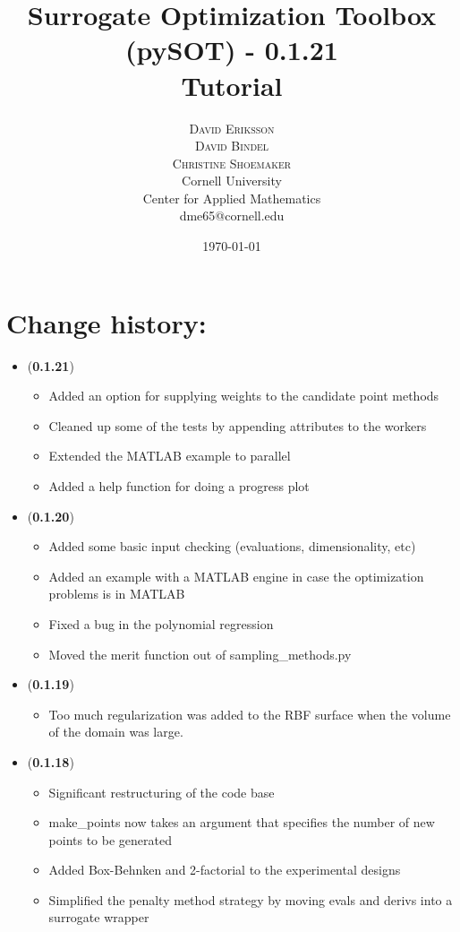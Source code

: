 \documentclass[]{article}
\title{\vspace{-15mm}%
	\fontsize{18pt}{10pt}\selectfont
	\textbf{Surrogate Optimization Toolbox (pySOT) - 0.1.21 \\ Tutorial}
	}
\author{%
	\Large\textsc{David Eriksson} \\[2mm]
	\Large\textsc{David Bindel} \\[2mm]
	\Large\textsc{Christine Shoemaker} \\[2mm]
		\normalsize	Cornell University \\
	\normalsize Center for Applied Mathematics \\
	\normalsize	dme65@cornell.edu \\ 
	}
\date{\today}
\begin{document}
\fontsize{12}{14}\rm

\maketitle
\thispagestyle{fancy}
\tableofcontents
\newpage

\section{Change history:}
\begin{itemize}

	\item (\textbf{0.1.21})
	\begin{itemize}
		\item 	Added an option for supplying weights to the candidate point methods
		\item Cleaned up some of the tests by appending attributes to the workers
		\item Extended the MATLAB example to parallel
		\item Added a help function for doing a progress plot
	\end{itemize}

	\item (\textbf{0.1.20})
	\begin{itemize}
		\item Added some basic input checking (evaluations, dimensionality, etc)
		\item Added an example with a MATLAB engine in case the optimization problems is in MATLAB
		\item Fixed a bug in the polynomial regression
		\item Moved the merit function out of sampling\_methods.py
	\end{itemize}

	\item (\textbf{0.1.19})
	\begin{itemize}
		\item 	Too much regularization was added to the RBF surface when the volume of the domain was large.
	\end{itemize}

	\item (\textbf{0.1.18})
	\begin{itemize}
		\item Significant restructuring of the code base
		\item make\_points now takes an argument that specifies the number of new points to be generated
		\item Added Box-Behnken and 2-factorial to the experimental designs
		\item Simplified the penalty method strategy by moving evals and derivs into a surrogate wrapper
	\end{itemize}


\end{itemize}
\end{document}
